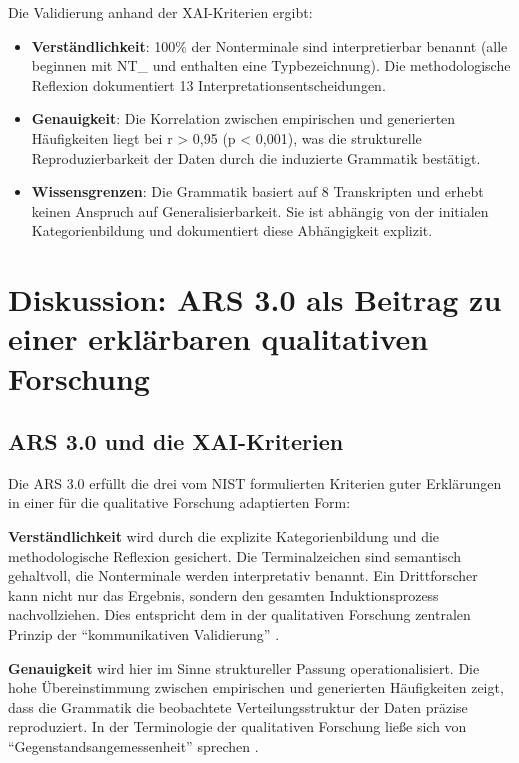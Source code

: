 \documentclass[
  12pt,
  a4paper,
  oneside,
  titlepage
]{article}
\begin{document}
Die Validierung anhand der XAI-Kriterien ergibt:

\begin{itemize}
    \item \textbf{Verständlichkeit}: 100\% der Nonterminale sind interpretierbar 
    benannt (alle beginnen mit NT\_ und enthalten eine Typbezeichnung). Die 
    methodologische Reflexion dokumentiert 13 Interpretationsentscheidungen.
    
    \item \textbf{Genauigkeit}: Die Korrelation zwischen empirischen und 
    generierten Häufigkeiten liegt bei r > 0,95 (p < 0,001), was die strukturelle 
    Reproduzierbarkeit der Daten durch die induzierte Grammatik bestätigt.
    
    \item \textbf{Wissensgrenzen}: Die Grammatik basiert auf 8 Transkripten und 
    erhebt keinen Anspruch auf Generalisierbarkeit. Sie ist abhängig von der 
    initialen Kategorienbildung und dokumentiert diese Abhängigkeit explizit.
\end{itemize}

\section{Diskussion: ARS 3.0 als Beitrag zu einer erklärbaren qualitativen Forschung}

\subsection{ARS 3.0 und die XAI-Kriterien}

Die ARS 3.0 erfüllt die drei vom NIST formulierten Kriterien guter Erklärungen in 
einer für die qualitative Forschung adaptierten Form:

\textbf{Verständlichkeit} wird durch die explizite Kategorienbildung und die 
methodologische Reflexion gesichert. Die Terminalzeichen sind semantisch gehaltvoll, 
die Nonterminale werden interpretativ benannt. Ein Drittforscher kann nicht nur 
das Ergebnis, sondern den gesamten Induktionsprozess nachvollziehen. Dies 
entspricht dem in der qualitativen Forschung zentralen Prinzip der 
\enquote{kommunikativen Validierung} \citep[ S.~328]{Flick2019}.

\textbf{Genauigkeit} wird hier im Sinne struktureller Passung operationalisiert. 
Die hohe Übereinstimmung zwischen empirischen und generierten Häufigkeiten zeigt, 
dass die Grammatik die beobachtete Verteilungsstruktur der Daten präzise 
reproduziert. In der Terminologie der qualitativen Forschung ließe sich von 
\enquote{Gegenstandsangemessenheit} sprechen \citep[ S.~34]{Przyborski2021}.
\end{document}
